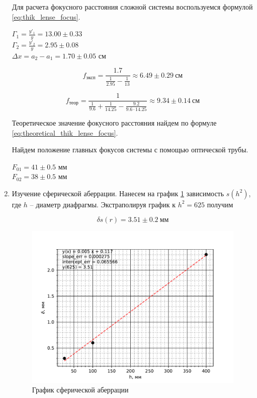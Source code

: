 \begin{enumerate}
		Для расчета фокусного расстояния сложной системы воспользуемся формулой \eqref{eq:thik_lense_focus}. 
		
		\begin{center}
			$\displaystyle \Gamma_1 = \frac{y'_1}{y} = 13.00 \pm 0.33$ \\
			$\displaystyle \Gamma_2 = \frac{y'_2}{y} = 2.95 \pm 0.08$ \\
			$\Delta x = a_2 - a_1 = 1.70 \pm 0.05$ см \\
		\end{center}
	
		\[ f_{\text{эксп}} = \frac{1.7}{\frac{1}{2.95} - \frac{1}{13}} \approx 6.49 \pm 0.29 ~ \text{см} \]
		
		\[ f_{\text{теор}} = \frac{1}{\frac{1}{9.6} + \frac{1}{14.25} - \frac{9.2}{9.6 \cdot 14.25}} \approx 9.34 \pm 0.14 ~ \text{см} \]
		
		Теоретическое значение фокусного расстояния найдем по формуле \eqref{eq:theoretical_thik_lense_focus}.
		
		Найдем положение главных фокусов системы с помощью оптической трубы.
		
		\begin{center}
			$F_{01} = 41 \pm 0.5$ мм \\ 
			$F_{02} = 38 \pm 0.5$ мм \\
		\end{center}
	
		\item Изучение сферической аберрации. Нанесем на график \ref{fig:spheric_aberration_graph} зависимость $s(h^2)$, где $h$ -- диаметр диафрагмы. Экстраполируя график к $h^2 = 625$ получим
		
		\[ \delta s(r) = 3.51 \pm 0.2 ~ \text{мм} \]
		
		\begin{figure}
			\centering
			\includegraphics[scale=0.5]{images/spheric_aberration.pdf}
			\caption{График сферической аберрации}
			\label{fig:spheric_aberration_graph}
		\end{figure}
		

\end{enumerate}

